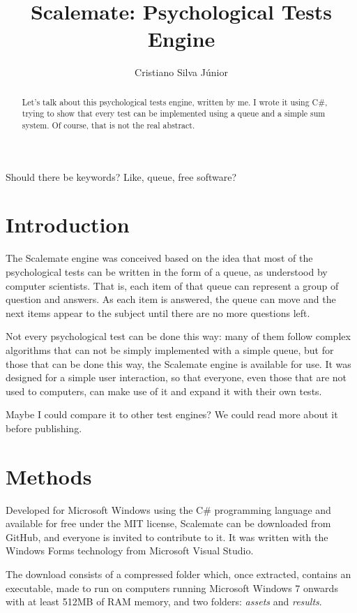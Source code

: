 \documentclass[12pt, a4paper, twoside]{article}
\begin{document}
\title{Scalemate: Psychological Tests Engine}
\author{Cristiano Silva Júnior}
\date{}
\maketitle

\begin{abstract}
Let's talk about this psychological tests engine, written by me. I wrote it
using C\#, trying to show that every test can be implemented using a queue
and a simple sum system. Of course, that is not the real abstract.
\end{abstract}

Should there be keywords? Like, queue, free software?

\section{Introduction}

The Scalemate engine was conceived based on the idea that most of the psychological tests can be written in the form of a queue, as understood by computer scientists. That is, each item of that queue can represent a group of question and answers. As each item is answered, the queue can move and the next items appear to the subject until there are no more questions left.

Not every psychological test can be done this way: many of them follow complex algorithms that can not be simply implemented with a simple queue, but for those that can be done this way, the Scalemate engine is available for use. It was designed for a simple user interaction, so that everyone, even those that are not used to computers, can make use of it and expand it with their own tests.

Maybe I could compare it to other test engines? We could read more about it before publishing.

\section{Methods}

Developed for Microsoft Windows using the C\# programming language and available for free under the MIT license, Scalemate can be downloaded from GitHub, and everyone is invited to contribute to it. It was written with the Windows Forms technology from Microsoft Visual Studio.

The download consists of a compressed folder which, once extracted, contains an executable, made to run on computers running Microsoft Windows 7 onwards with at least 512MB of RAM memory, and two folders: \textit{assets} and \textit{results}.
\end{document}
